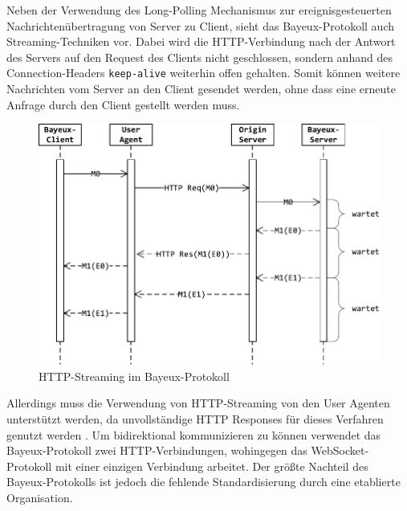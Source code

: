 \documentclass[11pt,a4paper,titlepage]{scrartcl}
\numberwithin{equation}{section}
\begin{document}
\noindent Neben der Verwendung des Long-Polling Mechanismus zur ereignisgesteuerten Nachrichtenübertragung von Server zu Client, sieht das Bayeux-Protokoll auch Streaming-Techniken vor. Dabei wird die HTTP-Verbindung nach der Antwort des Servers auf den Request des Clients nicht geschlossen, sondern anhand des Connection-Headers \texttt{keep-alive} weiterhin offen gehalten. Somit können weitere Nachrichten vom Server an den Client gesendet werden, ohne dass eine erneute Anfrage durch den Client gestellt werden muss. \\

\begin{figure}[ht] 
	\begin{center}
		\includegraphics[scale=1]{img/bayeuxstream.pdf}
		\caption{HTTP-Streaming im Bayeux-Protokoll}
		\label{fig:wsBayeuxStream}
	\end{center}
\end{figure}

\noindent Allerdings muss die Verwendung von HTTP-Streaming von den User Agenten unterstützt werden, da unvollständige HTTP Responses für dieses Verfahren genutzt werden \autocite{russell_cometd_2007}. Um bidirektional kommunizieren zu können verwendet das Bayeux-Protokoll zwei HTTP-Verbindungen, wohingegen das WebSocket-Protokoll mit einer einzigen Verbindung arbeitet. Der größte Nachteil des Bayeux-Protokolls ist jedoch die fehlende Standardisierung durch eine etablierte Organisation. 
\end{document}
